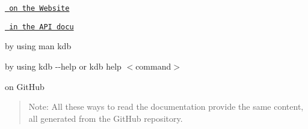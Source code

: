 \begin{DoxyItemize}
\item \href{https://www.libelektra.org}{\texttt{ on the Website}}
\item \href{https://doc.libelektra.org/api/latest/html/doc_help_kdb_md.html}{\texttt{ in the A\+PI docu}}
\item by using {\ttfamily man kdb}
\item by using {\ttfamily kdb -\/-\/help} or {\ttfamily kdb help $<$command$>$}
\item on Git\+Hub
\end{DoxyItemize}

\begin{quote}
Note\+: All these ways to read the documentation provide the same content, all generated from the Git\+Hub repository. \end{quote}



